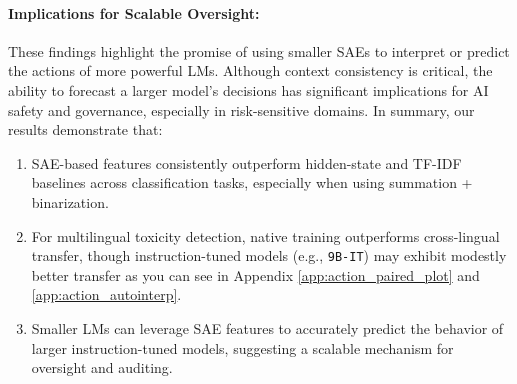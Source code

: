 \paragraph{Implications for Scalable Oversight:}
These findings highlight the promise of using smaller SAEs to interpret or predict the actions of more powerful LMs. Although context consistency is critical, the ability to forecast a larger model's decisions has significant implications for AI safety and governance, especially in risk-sensitive domains.
In summary, our results demonstrate that:
\begin{enumerate}[itemsep=-1.7pt,topsep=1.5pt]
    \item SAE-based features consistently outperform hidden-state and TF-IDF baselines across classification tasks, especially when using summation + binarization.
    \item For multilingual toxicity detection, native training outperforms cross-lingual transfer, though instruction-tuned models (e.g., \texttt{9B-IT}) may exhibit modestly better transfer as you can see in Appendix \ref{app:action_paired_plot} and \ref{app:action_autointerp}.
    \item Smaller LMs can leverage SAE features to accurately predict the behavior of larger instruction-tuned models, suggesting a scalable mechanism for oversight and auditing.
\end{enumerate}
